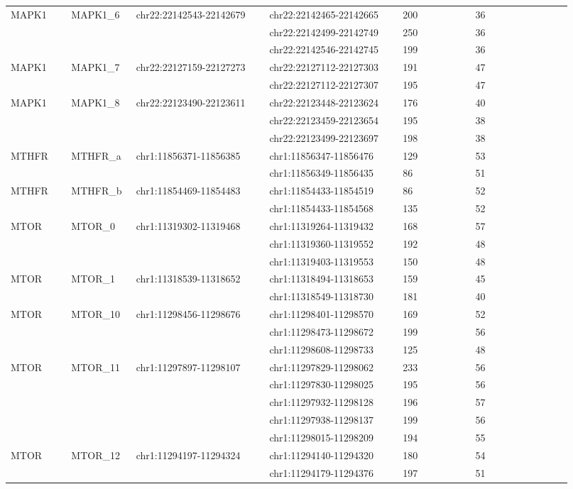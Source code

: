 \begin{landscape}
\begin{longtable}{p{0.1\linewidth}|p{0.1\linewidth}p{0.22\linewidth}p{0.22\linewidth}p{0.12\linewidth}p{0.16\linewidth}}
MAPK1 & MAPK1\_6 & chr22:22142543-22142679 & chr22:22142465-22142665 & 200 & 36
\\
 & & & chr22:22142499-22142749 & 250 & 36
\\
 & & & chr22:22142546-22142745 & 199 & 36
\\
MAPK1 & MAPK1\_7 & chr22:22127159-22127273 & chr22:22127112-22127303 & 191 & 47
\\
 & & & chr22:22127112-22127307 & 195 & 47
\\
MAPK1 & MAPK1\_8 & chr22:22123490-22123611 & chr22:22123448-22123624 & 176 & 40
\\
 & & & chr22:22123459-22123654 & 195 & 38
\\
 & & & chr22:22123499-22123697 & 198 & 38
\\
\hline
MTHFR & MTHFR\_a & chr1:11856371-11856385 & chr1:11856347-11856476 & 129 & 53
\\
 & & & chr1:11856349-11856435 & 86 & 51
\\
MTHFR & MTHFR\_b & chr1:11854469-11854483 & chr1:11854433-11854519 & 86 & 52
\\
 & & & chr1:11854433-11854568 & 135 & 52
\\
\hline
MTOR & MTOR\_0 & chr1:11319302-11319468 & chr1:11319264-11319432 & 168 & 57
\\
 & & & chr1:11319360-11319552 & 192 & 48
\\
 & & & chr1:11319403-11319553 & 150 & 48
\\
MTOR & MTOR\_1 & chr1:11318539-11318652 & chr1:11318494-11318653 & 159 & 45
\\
 & & & chr1:11318549-11318730 & 181 & 40
\\
MTOR & MTOR\_10 & chr1:11298456-11298676 & chr1:11298401-11298570 & 169 & 52
\\
 & & & chr1:11298473-11298672 & 199 & 56
\\
 & & & chr1:11298608-11298733 & 125 & 48
\\
MTOR & MTOR\_11 & chr1:11297897-11298107 & chr1:11297829-11298062 & 233 & 56
\\
 & & & chr1:11297830-11298025 & 195 & 56
\\
 & & & chr1:11297932-11298128 & 196 & 57
\\
 & & & chr1:11297938-11298137 & 199 & 56
\\
 & & & chr1:11298015-11298209 & 194 & 55
\\
MTOR & MTOR\_12 & chr1:11294197-11294324 & chr1:11294140-11294320 & 180 & 54
\\
 & & & chr1:11294179-11294376 & 197 & 51

\end{longtable}
\end{landscape}
